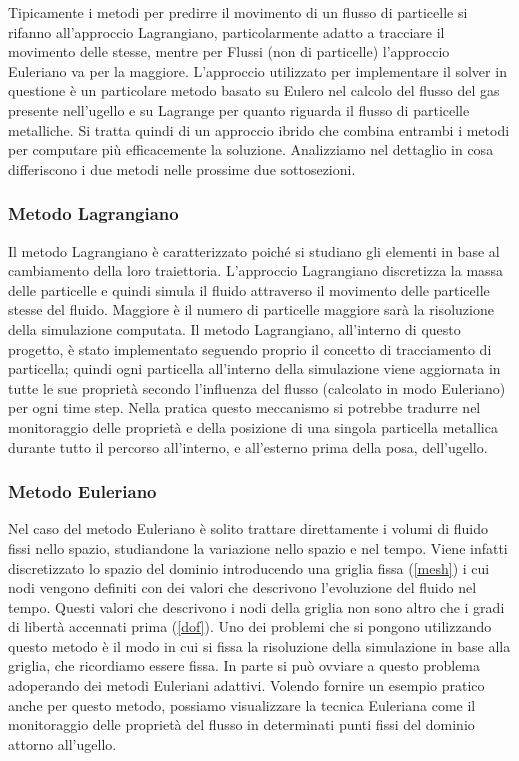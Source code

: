     Tipicamente i metodi per predirre il movimento di un flusso di particelle si rifanno all'approccio Lagrangiano, particolarmente adatto a tracciare il movimento delle stesse,
    mentre per Flussi (non di particelle) l'approccio Euleriano va per la maggiore.
    L'approccio utilizzato per implementare il solver in questione è un particolare metodo basato su Eulero nel calcolo del flusso del gas presente nell'ugello e su Lagrange
    per quanto riguarda il flusso di particelle metalliche. Si tratta quindi di un approccio ibrido che combina entrambi i metodi per computare più efficacemente la soluzione.
    Analizziamo nel dettaglio in cosa differiscono i due metodi nelle prossime due sottosezioni.
        \subsubsection{Metodo Lagrangiano}
        Il metodo Lagrangiano è caratterizzato poiché si studiano gli elementi in base al cambiamento della loro traiettoria.
        L'approccio Lagrangiano discretizza la massa delle particelle e quindi simula il fluido attraverso il movimento delle particelle stesse del fluido. Maggiore è il numero di particelle
        maggiore sarà la risoluzione della simulazione computata.
        Il metodo Lagrangiano, all'interno di questo progetto, è stato implementato seguendo proprio il concetto di tracciamento di particella; quindi ogni particella all'interno della simulazione
        viene aggiornata in tutte le sue proprietà secondo l'influenza del flusso (calcolato in modo Euleriano) per ogni time step. Nella pratica questo meccanismo si potrebbe tradurre nel
        monitoraggio delle proprietà e della posizione di una singola particella metallica durante tutto il percorso all'interno, e all'esterno prima della posa, dell'ugello.
        \subsubsection{Metodo Euleriano}
        Nel caso del metodo Euleriano è solito trattare direttamente i volumi di fluido fissi nello spazio, studiandone la variazione nello spazio e nel tempo.
        Viene infatti discretizzato lo spazio del dominio introducendo una griglia fissa (\ref{mesh}) i cui nodi vengono definiti con dei valori che descrivono l'evoluzione del fluido nel tempo.
        Questi valori che descrivono i nodi della griglia non sono altro che i gradi di libertà accennati prima (\ref{dof}).
        Uno dei problemi che si pongono utilizzando questo metodo è il modo in cui si fissa la risoluzione della simulazione in base alla griglia, che ricordiamo essere fissa. In parte si può ovviare
        a questo problema adoperando dei metodi Euleriani adattivi.
        Volendo fornire un esempio pratico anche per questo metodo, possiamo visualizzare la tecnica Euleriana come il monitoraggio delle proprietà del flusso in determinati punti fissi del dominio
        attorno all'ugello.
